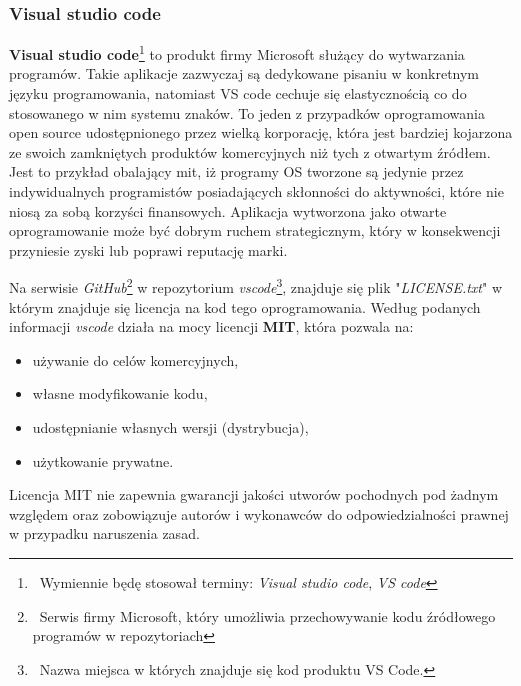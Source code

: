 \documentclass{article}
\begin{document}
\subsubsection{Visual studio code}

\hspace{4mm} \textbf{Visual studio code}\footnote{\, Wymiennie będę stosował terminy: \emph{Visual studio code}, \emph{VS code}} to produkt firmy Microsoft służący do wytwarzania programów. Takie aplikacje zazwyczaj są dedykowane pisaniu w konkretnym języku programowania, natomiast VS code cechuje się elastycznością co do stosowanego w nim systemu znaków. To jeden z przypadków oprogramowania open source udostępnionego przez wielką korporację, która jest bardziej kojarzona ze swoich zamkniętych produktów komercyjnych niż tych z otwartym źródłem. Jest to przykład obalający mit, iż programy OS tworzone są jedynie przez indywidualnych programistów posiadających skłonności do aktywności, które nie niosą za sobą korzyści finansowych. Aplikacja wytworzona jako otwarte oprogramowanie może być dobrym ruchem strategicznym, który w konsekwencji przyniesie zyski lub poprawi reputację marki.

Na serwisie \emph{GitHub}\footnote{\, Serwis firmy Microsoft, który umożliwia przechowywanie kodu źródłowego programów w repozytoriach} w repozytorium \emph{vscode}\footnote{\, Nazwa miejsca w których znajduje się kod produktu VS Code.}, znajduje się plik "\emph{LICENSE.txt}" w którym znajduje się licencja na kod tego oprogramowania. Według podanych informacji \emph{vscode} działa na mocy licencji \textbf{MIT}, która pozwala na:
\begin{itemize}
    \item używanie do celów komercyjnych,
    \item własne modyfikowanie kodu,
    \item udostępnianie własnych wersji (dystrybucja),
    \item użytkowanie prywatne.
\end{itemize}
Licencja MIT nie zapewnia gwarancji jakości utworów pochodnych pod żadnym względem oraz zobowiązuje autorów i wykonawców do odpowiedzialności prawnej w przypadku naruszenia zasad\cite{vscode.mit}.
\end{document}
